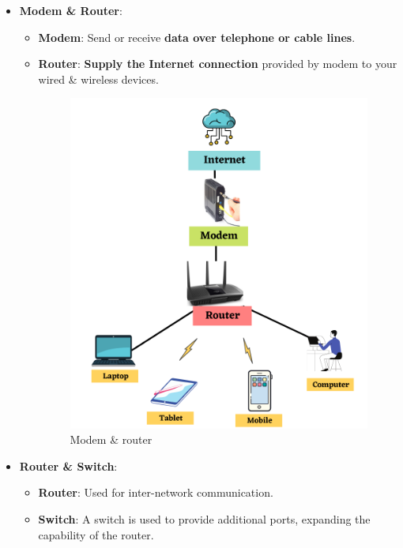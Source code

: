 \setlength{\columnsep}{3pt}
\begin{flushleft}
	\begin{itemize}
		\item \textbf{Modem \& Router}: 
		\begin{itemize}
			\item \textbf{Modem}: Send or receive \textbf{data over telephone or cable lines}.
			\item \textbf{Router}: \textbf{Supply the Internet connection} provided by modem to your wired \& wireless devices.
			\begin{figure}[h!]
				\centering
				\includegraphics[scale=0.6]{content/chapter14/images/modem_internet.png}
				\caption{Modem \& router}
				\label{fig:modem_router}
			\end{figure}
		\end{itemize}
		\newpage
		\item \textbf{Router \& Switch}: 
		\begin{itemize}
			\item \textbf{Router}: Used for inter-network communication.
			\item \textbf{Switch}: A switch is used to provide additional ports, expanding the capability of the router.

\end{itemize}
\end{itemize}
\end{flushleft}
